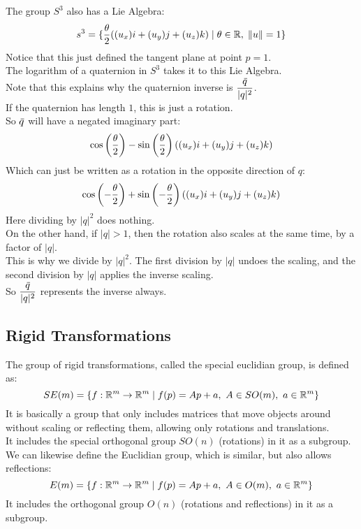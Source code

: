 \documentclass[12pt]{article}
\begin{document}
The group $S^3$ also has a Lie Algebra:
\[ s^3 = \{ \dfrac{\theta}{2}((u_x)i + (u_y)j + (u_z)k) 
\mid \theta \in \mathbb{R}, \;  \|u\| = 1 \} \]
Notice that this just defined the tangent
plane at point $p = 1$. \\
The logarithm of a quaternion in $S^3$ takes it
to this Lie Algebra. \\

Note that this explains why
the quaternion inverse is 
$\dfrac{\,\overline{\!{q}}}{|q|^2}$. \\
If the quaternion has length $1$,
this is just a rotation. \\
So $\,\overline{\!{q}}$
will have a negated imaginary part:
\[ \cos \left( \dfrac{\theta}{2} \right)
- \sin \left( \dfrac{\theta}{2} \right)
((u_x)i + (u_y)j + (u_z)k) \]
Which can just be written as a rotation in 
the opposite direction of $q$:
\[\cos \left( -\dfrac{\theta}{2} \right)
+ \sin \left( -\dfrac{\theta}{2} \right)
((u_x)i + (u_y)j + (u_z)k) \]
Here dividing by $|q|^2$ does nothing. \\
On the other hand, if $|q| > 1$,
then the rotation also scales at the same time,
by a factor of $|q|$. \\
This is why we divide by $|q|^2$.
The first division by $|q|$ undoes the
scaling, and the second division by $|q|$
applies the inverse scaling. \\
So $\dfrac{\,\overline{\!{q}}}{|q|^2}$
represents the inverse always. \\

\newpage

\subsection*{Rigid Transformations}

The group of rigid transformations,
called the special euclidian group,
is defined as:
\[ SE(m) = \left\{ f : \mathbb{R}^m \to 
\mathbb{R}^m \mid f(p) = Ap + a,\ A 
\in SO(m),\ a \in \mathbb{R}^m \right\} \]
It is basically a group that only includes
matrices that move objects around without scaling
or reflecting them,
allowing only rotations and translations. \\
It includes the special orthogonal group $SO(n)$
(rotations) in it as a subgroup. \\

We can likewise define the Euclidian group,
which is similar, but also allows reflections:
\[ E(m) = \left\{ f : \mathbb{R}^m \to 
\mathbb{R}^m \mid f(p) = Ap + a,\ A 
\in O(m),\ a \in \mathbb{R}^m \right\} \]
It includes the orthogonal group $O(n)$
(rotations and reflections) in it as a subgroup. \\
\end{document}
